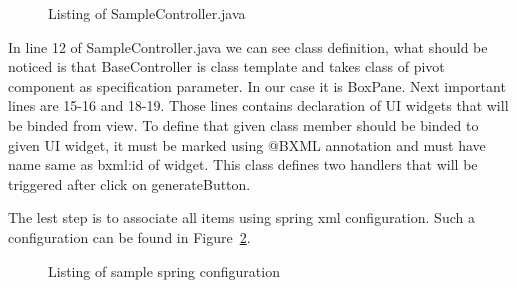 \pagebreak

\begin{figure}[ht]
  \centering
    
  \caption{Listing of SampleController.java}
  \label{fig:sample_controller}
\end{figure} 

In line 12 of SampleController.java we can see class definition, what should be noticed is that BaseController is
class template and takes class of pivot component as specification parameter. In our case it is BoxPane. Next important
lines are 15-16 and 18-19. Those lines contains declaration of UI widgets that will be binded from view. To define that
given class member should be binded to given UI widget, it must be marked using @BXML annotation and must have name same
as bxml:id of widget. This class defines two handlers that will be triggered after click on generateButton.  

\pagebreak
The lest step is to associate all items using spring xml configuration. Such a configuration can be found in
Figure~\ref{fig:sample_spring}.


\begin{figure}[ht]
  \centering
    
  \caption{Listing of sample spring configuration}
  \label{fig:sample_spring}
\end{figure}



 